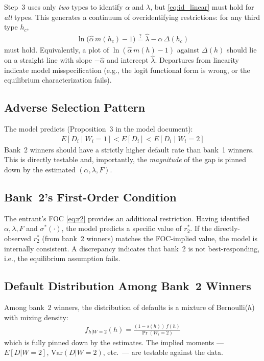 \documentclass[12pt]{article}
\theoremstyle{plain}
\theoremstyle{plain}
\theoremstyle{definition}  %
\theoremstyle{remark}  %
\begin{document}
Step~3 uses only \emph{two} types to identify $\alpha$ and $\lambda$, but \eqref{eq:id_linear} must hold for \emph{all} types. This generates a continuum of overidentifying restrictions: for any third type $h_c$,
\begin{align*}
    \ln\!\big(\hat\alpha\, m(h_c) - 1\big) \stackrel{?}{=} \hat\lambda - \hat\alpha\, \Delta(h_c)
\end{align*}
must hold. Equivalently, a plot of $\ln(\hat\alpha\, m(h) - 1)$ against $\Delta(h)$ should lie on a straight line with slope $-\hat\alpha$ and intercept $\hat\lambda$. Departures from linearity indicate model misspecification (e.g., the logit functional form is wrong, or the equilibrium characterization fails).

\subsection{Adverse Selection Pattern}

The model predicts (Proposition~3 in the model document):
\begin{align}\label{eq:adverse_test}
    E[D_i \mid W_i = 1] < E[D_i] < E[D_i \mid W_i = 2]
\end{align}
Bank~2 winners should have a strictly higher default rate than bank~1 winners. This is directly testable and, importantly, the \emph{magnitude} of the gap is pinned down by the estimated $(\alpha, \lambda, F)$.

\subsection{Bank~2's First-Order Condition}

The entrant's FOC \eqref{eq:r2} provides an additional restriction. Having identified $\alpha, \lambda, F$ and $\sigma^*(\cdot)$, the model predicts a specific value of $r_2^*$. If the directly-observed $r_2^*$ (from bank~2 winners) matches the FOC-implied value, the model is internally consistent. A discrepancy indicates that bank~2 is not best-responding, i.e., the equilibrium assumption fails.

\subsection{Default Distribution Among Bank~2 Winners}

Among bank~2 winners, the distribution of defaults is a mixture of Bernoulli($h$) with mixing density:
\begin{align*}
    f_{h|W=2}(h) = \frac{(1-s(h))\, f(h)}{\Pr(W_i = 2)}
\end{align*}
which is fully pinned down by the estimates. The implied moments --- $E[D|W=2]$, $\text{Var}(D|W=2)$, etc.\ --- are testable against the data.
\end{document}

